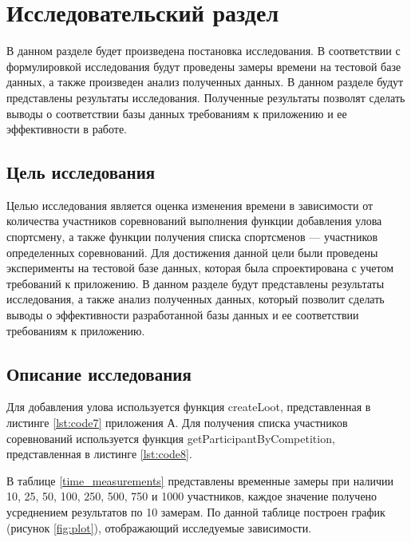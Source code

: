  \section{Исследовательский раздел} \label{search}

В данном разделе будет произведена постановка исследования. В соответствии с формулировкой исследования будут проведены замеры времени на тестовой базе данных, а также произведен анализ полученных данных. В данном разделе будут представлены результаты исследования. Полученные результаты позволят сделать выводы о соответствии базы данных требованиям к приложению и ее эффективности в работе.

\subsection{Цель исследования}

Целью исследования является оценка изменения времени в зависимости от количества участников соревнований выполнения функции добавления улова спортсмену, а также функции получения списка спортсменов --- участников определенных соревнований. Для достижения данной цели были проведены эксперименты на тестовой базе данных, которая была спроектирована с учетом требований к приложению. В данном разделе будут представлены результаты исследования, а также анализ полученных данных, который позволит сделать выводы о эффективности разработанной базы данных и ее соответствии требованиям к приложению.

\subsection{Описание исследования}

Для добавления улова используется функция createLoot, представленная в листинге \ref{lst:code7} приложения А. Для получения списка участников соревнований используется функция getParticipantByCompetition, представленная в листинге \ref{lst:code8}.

В таблице \ref{time_measurements} представлены временные замеры при наличии 10, 25, 50, 100, 250, 500, 750 и 1000 участников, каждое значение получено усреднением результатов по 10 замерам. По данной таблице построен график (рисунок \ref{fig:plot}), отображающий исследуемые зависимости.

